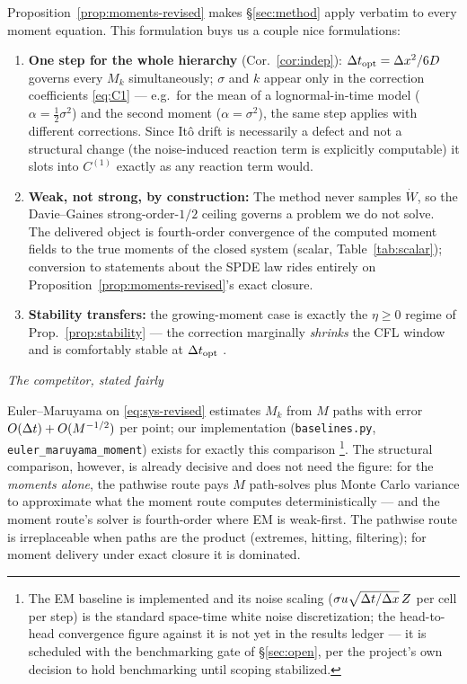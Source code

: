 Proposition~\ref{prop:moments-revised} makes \S\ref{sec:method} apply verbatim to every moment equation. This formulation buys us a couple nice formulations:

\begin{enumerate}
\item \textbf{One step for the whole hierarchy} (Cor.~\ref{cor:indep}): $\Delta t_{\mathrm{opt}} = \Delta x^2/6D$ governs every $M_k$ simultaneously; $\sigma$ and $k$ appear only in the correction coefficients \eqref{eq:C1} --- e.g.\ for the mean of a lognormal-in-time model ($\alpha=\frac12\sigma^2$) and the second moment ($\alpha=\sigma^2$), the same step applies with different corrections. Since It\^o drift is necessarily a defect and not a structural change (the noise-induced reaction term is explicitly computable) it slots into $C^{(1)}$ exactly as any reaction term would. 

\item \textbf{Weak, not strong, by construction:} The method never samples $\dot W$, so the Davie--Gaines strong-order-$1/2$ ceiling \citep{davie2001} governs a problem we do not solve. The delivered object is fourth-order convergence of the computed moment fields to the true moments of the closed system \tagV (scalar, Table~\ref{tab:scalar}); conversion to statements about the SPDE law rides entirely on Proposition~\ref{prop:moments-revised}'s exact closure.
  
\item \textbf{Stability transfers:} the growing-moment case is exactly the $\eta\ge0$ regime of Prop.~\ref{prop:stability} --- the correction marginally \emph{shrinks} the CFL window and is comfortably stable at $\Delta t_{\mathrm{opt}}$ \tagV. 
\end{enumerate}

\emph{The competitor, stated fairly}

Euler--Maruyama on \eqref{eq:sys-revised} estimates $M_k$ from $M$ paths with error
$O(\Delta t) + O(M^{-1/2})$ per point; our implementation (\texttt{baselines.py},
\texttt{euler\_maruyama\_moment}) exists for exactly this comparison
\tagS\footnote{The EM baseline is implemented and its noise scaling
($\sigma u\sqrt{\Delta t/\Delta x}\,Z$ per cell per step) is the standard space-time white
noise discretization; the head-to-head convergence figure against it is not yet
in the results ledger --- it is scheduled with the benchmarking gate of
\S\ref{sec:open}, per the project's own decision to hold benchmarking until
scoping stabilized.}. The structural comparison, however, is already decisive
and does not need the figure: for the \emph{moments alone}, the pathwise route
pays $M$ path-solves plus Monte Carlo variance to approximate what the moment
route computes deterministically --- and the moment route's solver is
fourth-order where EM is weak-first. The pathwise route is irreplaceable when
paths are the product (extremes, hitting, filtering); for moment delivery under
exact closure it is dominated.


